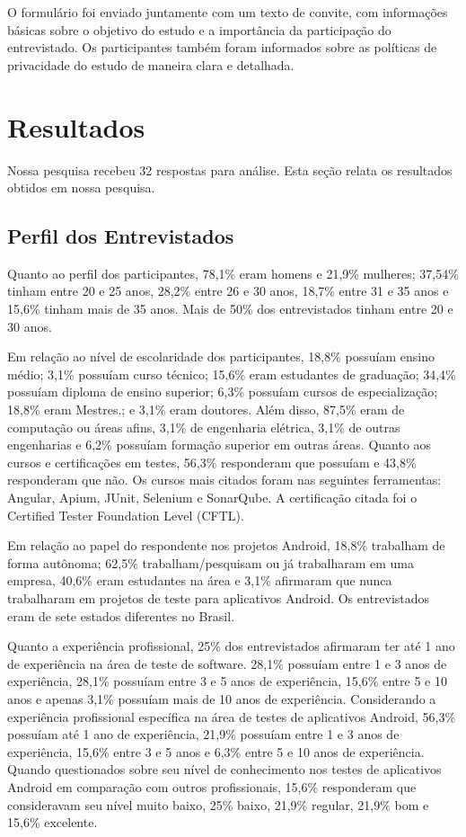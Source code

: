 O formulário foi enviado juntamente com um texto de convite, com informações básicas sobre o objetivo do estudo e a importância da participação do entrevistado. Os participantes também foram informados sobre as políticas de privacidade do estudo de maneira clara e detalhada.

\section{Resultados}\label{resultssurvey}

Nossa pesquisa recebeu 32 respostas para análise. Esta seção relata os resultados obtidos em nossa pesquisa.

\subsection{Perfil dos Entrevistados}

Quanto ao perfil dos participantes, 78,1\% eram homens e 21,9\% mulheres; 37,54\% tinham entre 20 e 25 anos, 28,2\% entre 26 e 30 anos, 18,7\% entre 31 e 35 anos e 15,6\% tinham mais de 35 anos. Mais de 50\% dos entrevistados tinham entre 20 e 30 anos.

Em relação ao nível de escolaridade dos participantes, 18,8\% possuíam ensino médio; 3,1\% possuíam curso técnico; 15,6\% eram estudantes de graduação; 34,4\% possuíam diploma de ensino superior; 6,3\% possuíam cursos de especialização; 18,8\% eram Mestres.; e 3,1\% eram doutores. Além disso, 87,5\% eram de computação ou áreas afins, 3,1\% de engenharia elétrica, 3,1\% de outras engenharias e 6,2\% possuíam formação superior em outras áreas. Quanto aos cursos e certificações em testes, 56,3\% responderam que possuíam e 43,8\% responderam que não. Os cursos mais citados foram nas seguintes ferramentas: Angular, Apium, JUnit, Selenium e SonarQube. A certificação citada foi o Certified Tester Foundation Level (CFTL).

Em relação ao papel do respondente nos projetos Android, 18,8\% trabalham de forma autônoma; 62,5\% trabalham/pesquisam ou já trabalharam em uma empresa, 40,6\% eram estudantes na área e 3,1\% afirmaram que nunca trabalharam em projetos de teste para aplicativos Android. Os entrevistados eram de sete estados diferentes no Brasil.

Quanto a experiência profissional, 25\% dos entrevistados afirmaram ter até 1 ano de experiência na área de teste de software. 28,1\% possuíam entre 1 e 3 anos de experiência, 28,1\% possuíam entre 3 e 5 anos de experiência, 15,6\% entre 5 e 10 anos e apenas 3,1\% possuíam mais de 10 anos de experiência. Considerando a experiência profissional específica na área de testes de aplicativos Android, 56,3\% possuíam até 1 ano de experiência, 21,9\% possuíam entre 1 e 3 anos de experiência, 15,6\% entre 3 e 5 anos e 6,3\% entre 5 e 10 anos de experiência. Quando questionados sobre seu nível de conhecimento nos testes de aplicativos Android em comparação com outros profissionais, 15,6\% responderam que consideravam seu nível muito baixo, 25\% baixo, 21,9\% regular, 21,9\% bom e 15,6\% excelente.

